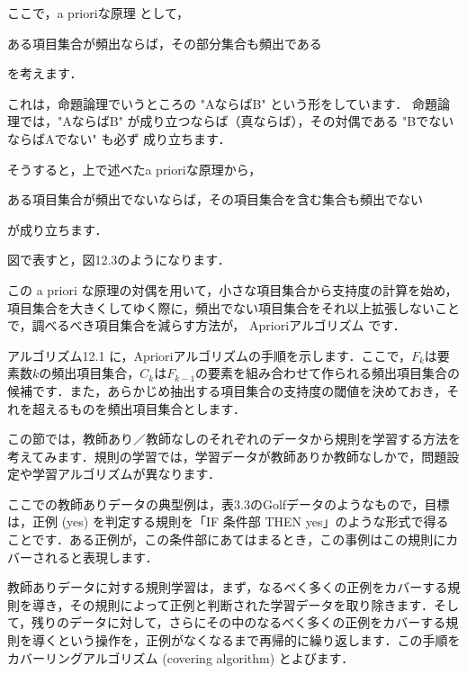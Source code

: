 
ここで，a prioriな原理
として，

ある項目集合が頻出ならば，その部分集合も頻出である

を考えます．


これは，命題論理でいうところの "AならばB" という形をしています．
命題論理では，"AならばB" が成り立つならば（真ならば），その対偶である "BでないならばAでない" も必ず
成り立ちます．


そうすると，上で述べたa prioriな原理から，

ある項目集合が頻出でないならば，その項目集合を含む集合も頻出でない

が成り立ちます．


図で表すと，図12.3のようになります．


この a priori な原理の対偶を用いて，小さな項目集合から支持度の計算を始め，項目集合を大きくしてゆく際に，頻出でない項目集合をそれ以上拡張しないことで，調べるべき項目集合を減らす方法が，
Aprioriアルゴリズム
です．


アルゴリズム12.1 に，Aprioriアルゴリズムの手順を示します．ここで，$F_k$は要素数$k$の頻出項目集合，$C_k$は$F_{k-1}$の要素を組み合わせて作られる頻出項目集合の候補です．また，あらかじめ抽出する項目集合の支持度の閾値を決めておき，それを超えるものを頻出項目集合とします．



この節では，教師あり／教師なしのそれぞれのデータから規則を学習する方法を考えてみます．規則の学習では，学習データが教師ありか教師なしかで，問題設定や学習アルゴリズムが異なります．


ここでの教師ありデータの典型例は，表3.3のGolfデータのようなもので，目標は，正例 (yes) を判定する規則を「IF 条件部 THEN yes」のような形式で得ることです．ある正例が，この条件部にあてはまるとき，この事例はこの規則にカバーされると表現します．

教師ありデータに対する規則学習は，まず，なるべく多くの正例をカバーする規則を導き，その規則によって正例と判断された学習データを取り除きます．そして，残りのデータに対して，さらにその中のなるべく多くの正例をカバーする規則を導くという操作を，正例がなくなるまで再帰的に繰り返します．この手順を
カバーリングアルゴリズム
(covering algorithm) とよびます．


